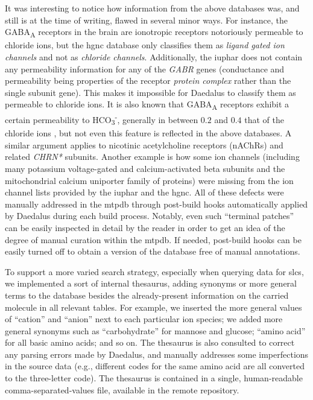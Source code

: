 It was interesting to notice how information from the above databases was, and still is at the time of writing, flawed in several minor ways.
For instance, the GABA\textsubscript{A} receptors in the brain are ionotropic receptors notoriously permeable to chloride ions, but the \gls{hgnc} database only classifies them as \textit{ligand gated ion channels} and not as \textit{chloride channels}.
Additionally, the \gls{iuphar} does not contain any permeability information for any of the \textit{GABR\textasteriskcentered{}} genes (conductance and permeability being properties of the receptor \textit{protein complex} rather than the single subunit gene).
This makes it impossible for Daedalus to classify them as permeable to chloride ions.
It is also known that GABA\textsubscript{A} receptors exhibit a certain permeability to HCO\textsubscript{3}\textsuperscript{-}, generally in between $0.2$ and $0.4$ that of the chloride ions \cite{goetzGABAAReceptors2007}, but not even this feature is reflected in the above databases.
A similar argument applies to nicotinic acetylcholine receptors (nAChRs) and related \textit{CHRN*} subunits.
Another example is how some ion channels (including many potassium voltage-gated and calcium-activated beta subunits and the mitochondrial calcium uniporter family of proteins) were missing from the ion channel lists provided by the \gls{iuphar} and the \gls{hgnc}.
All of these defects were manually addressed in the \gls{mtpdb} through post-build hooks automatically applied by Daedalus during each build process.
Notably, even such ``terminal patches'' can be easily inspected in detail by the reader in order to get an idea of the degree of manual curation within the \gls{mtpdb}.
If needed, post-build hooks can be easily turned off to obtain a version of the database free of manual annotations.

To support a more varied search strategy, especially when querying data for \glspl{slc}, we implemented a sort of internal thesaurus, adding synonyms or more general terms to the database besides the already-present information on the carried molecule in all relevant tables.
For example, we inserted the more general values of ``cation'' and ``anion'' next to each particular ion species;
we added more general synonyms such as ``carbohydrate'' for mannose and glucose;
``amino acid'' for all basic amino acids; and so on.
The thesaurus is also consulted to correct any parsing errors made by Daedalus, and manually addresses some imperfections in the source data (e.g., different codes for the same amino acid are all converted to the three-letter code).
The thesaurus is contained in a single, human-readable comma-separated-values file, available in the remote repository.

